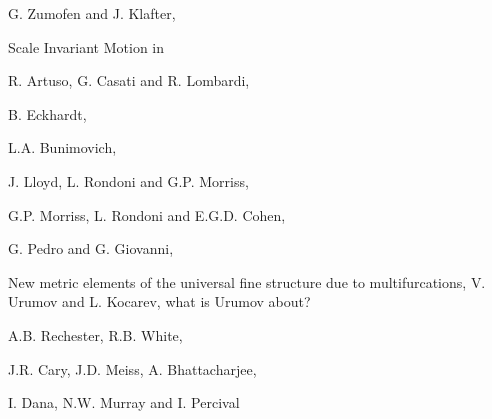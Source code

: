  G. Zumofen and J. Klafter, {\sf Scale Invariant Motion in

 R. Artuso, G. Casati and R. Lombardi,

 B. Eckhardt,

 L.A. Bunimovich,

  J. Lloyd, L. Rondoni and G.P. Morriss,

  G.P. Morriss, L. Rondoni and E.G.D. Cohen,


 G. Pedro and G. Giovanni, %



 {New metric elements of the universal fine structure due to multifurcations},
 {V. Urumov and L. Kocarev},
{what is Urumov about?}

 A.B. Rechester, R.B. White,

J.R. Cary, J.D. Meiss, A. Bhattacharjee,

 I. Dana, N.W. Murray and I. Percival

}
